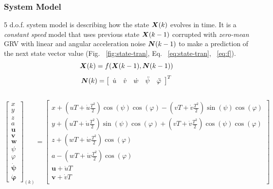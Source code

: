 \begin{frame}\frametitle{System Model}
5 d.o.f. system model is describing how the state $\boldsymbol{X}(k)$ evolves in time. It is a \textit{constant speed} model \cite{ribas10} that uses previous state $\boldsymbol{X}(k-1)$ corrupted with \textit{zero-mean} GRV with linear and angular acceleration noise  $\boldsymbol{N}(k-1)$ to make a prediction of the next state vector value (Fig. ~\ref{fig:state-tran}, Eq. ~\ref{eq:state-tran}, ~\ref{eq:f}).
\begin{equation}
\vspace{-5pt}
\vect{X}(k) = f(\vect{X}(k-1), \vect{N}(k-1))
\label{eq:f}
\end{equation}
$$\boldsymbol{N}(k) = \left[ \begin{array}{ccccc} \dot{u} & \dot{v} & \dot{w} & \ddot{\psi} & \ddot{\varphi} \end{array} \right]^{T}$$%
\vspace{-10pt}
\begin{columns}
\begin{tiny}
\begin{equation}
\begin{bmatrix} x \\ y \\ z \\ a \\ \boldsymbol{u} \\ \boldsymbol{v} \\ \boldsymbol{w} \\ \psi \\ \varphi \\ \boldsymbol{\dot{\psi}} \\ \boldsymbol{\dot{\varphi}} \end{bmatrix}_{(k)} =
\begin{bmatrix} x + (uT+\dot{u}\frac{T^{2}}{2})\cos(\psi)\cos(\varphi) - (vT+\dot{v}\frac{T^{2}}{2})\sin(\psi)\cos(\varphi) \\ 
                y + (uT+\dot{u}\frac{T^{2}}{2})\sin(\psi)\cos(\varphi) + (vT+\dot{v}\frac{T^{2}}{2})\cos(\psi)\cos(\varphi) \\ 
                z + (wT+\dot{w}\frac{T^{2}}{2})\cos(\varphi) \\ 
                a - (wT+\dot{w}\frac{T^{2}}{2})\cos(\varphi) \\ 
                \boldsymbol{u} + \dot{u}T \\ 
                \boldsymbol{v} + \dot{v}T \\ 

\end{bmatrix}
\end{equation}
\end{tiny}
\end{columns}
\end{frame}
